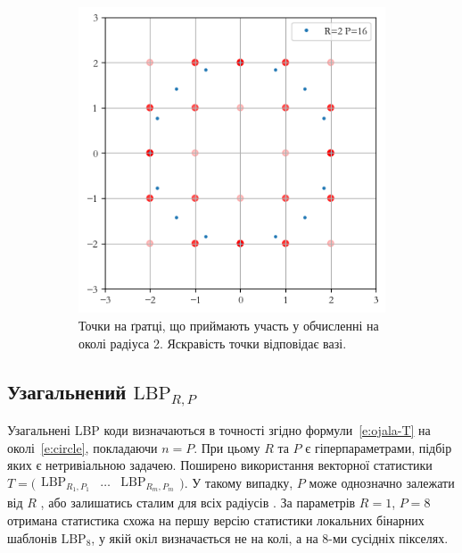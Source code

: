 \begin{figure}[h]
\begin{subfigure}{0.48\textwidth}
    \includegraphics[width=0.9\linewidth]{img/clique-2-interp.png}
    \caption{
        Точки на ґратці, що приймають участь у обчисленні на околі радіуса 2.
        Яскравість точки відповідає вазі.
    }
    \label{subfig:clique-2b}
    \end{subfigure}
    
    \caption{}
    \label{fig:clique-2}
\end{figure}

\subsection{Узагальнений \(\mathrm{LBP}_{R,P}\)}\label{section1.1a}\hfill

Узагальнені LBP коди \cite{ojala2002} визначаються в точності згідно формули~\eqref{e:ojala-T} на околі~\eqref{e:circle}, покладаючи $n=P$.
При цьому $R$ та $P$ є гіперпараметрами, підбір яких є нетривіальною задачею.
Поширено використання векторної статистики $T = \bigl(\begin{matrix}
    \mathrm{LBP}_{R_1,P_1} & \dots  & \mathrm{LBP}_{R_m,P_m}
\end{matrix}\bigr)$. У такому випадку, $P$ може однозначно залежати від $R$ \cite{fastlbp2024}, або залишатись сталим для всіх радіусів \cite{huawudeng2004}.
За параметрів $R=1$, $P=8$ отримана статистика схожа на першу версію статистики локальних бінарних шаблонів $\mathrm{LBP}_8$, у якій окіл визначається не на колі, а на 8-ми сусідніх пікселях.

